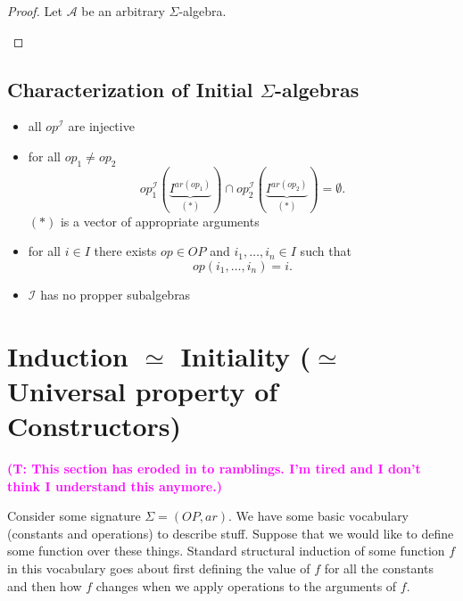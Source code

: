 \documentclass{amsart}
\theoremstyle{definition}
\newcommand{\truls}[1]{\textbf{\textcolor{magenta}{(T: #1)}}}
\newcommand{\ca}{\mathcal A} %
\begin{document}
\begin{proof} Let $\ca$ be an arbitrary $\Sigma$-algebra.
\begin{center}
\end{center}
\end{proof}

\subsection{Characterization of Initial $\Sigma$-algebras}
\begin{itemize}
\item all $op^{\mathcal I}$ are injective
\item for all $op_1 \neq op_2$
$$op^{\mathcal I}_1(\underbrace{I^{ar(op_1)}}_{(*)}) \cap op^{\mathcal I}_2(\underbrace{I^{ar(op_2)}}_{(*)}) = \emptyset.$$
$(*)$ is a vector of appropriate arguments
\item for all $i \in I$ there exists $op \in OP$ and $i_1, \dots, i_n \in I$ such that
$$ op(i_1, \dots, i_n) = i.$$
\item $\mathcal I$ has no propper subalgebras
\end{itemize}

\section{Induction $\simeq$ Initiality ($\simeq$ Universal property of Constructors)}
\truls{This section has eroded in to ramblings. I'm tired and I don't think I understand this anymore.}

Consider some signature $\Sigma = (OP, ar)$. We have some basic vocabulary (constants and operations) to describe stuff. Suppose that we would like to define some function over these things. Standard structural induction of some function $f$ in this vocabulary goes about first defining the value of $f$ for all the constants and then how $f$ changes when we apply operations to the arguments of $f$.
\end{document}
